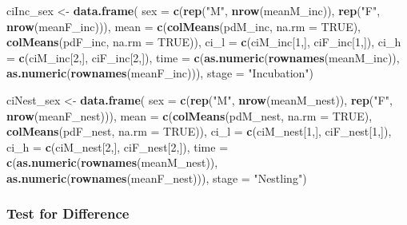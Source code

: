 \documentclass[]{article}
\newenvironment{Shaded}{\begin{snugshade}}{\end{snugshade}}
\newcommand{\DataTypeTok}[1]{\textcolor[rgb]{0.13,0.29,0.53}{#1}}
\newcommand{\DecValTok}[1]{\textcolor[rgb]{0.00,0.00,0.81}{#1}}
\newcommand{\KeywordTok}[1]{\textcolor[rgb]{0.13,0.29,0.53}{\textbf{#1}}}
\newcommand{\NormalTok}[1]{#1}
\newcommand{\OtherTok}[1]{\textcolor[rgb]{0.56,0.35,0.01}{#1}}
\newcommand{\StringTok}[1]{\textcolor[rgb]{0.31,0.60,0.02}{#1}}
\begin{document}
\begin{Shaded}
\begin{Highlighting}[]
\NormalTok{ciInc_sex <-}\StringTok{ }\KeywordTok{data.frame}\NormalTok{(}
    \DataTypeTok{sex =} \KeywordTok{c}\NormalTok{(}\KeywordTok{rep}\NormalTok{(}\StringTok{"M"}\NormalTok{, }\KeywordTok{nrow}\NormalTok{(meanM_inc)), }\KeywordTok{rep}\NormalTok{(}\StringTok{"F"}\NormalTok{, }\KeywordTok{nrow}\NormalTok{(meanF_inc))),}
    \DataTypeTok{mean =} \KeywordTok{c}\NormalTok{(}\KeywordTok{colMeans}\NormalTok{(pdM_inc, }\DataTypeTok{na.rm =} \OtherTok{TRUE}\NormalTok{), }\KeywordTok{colMeans}\NormalTok{(pdF_inc, }\DataTypeTok{na.rm =} \OtherTok{TRUE}\NormalTok{)),}
    \DataTypeTok{ci_l =} \KeywordTok{c}\NormalTok{(ciM_inc[}\DecValTok{1}\NormalTok{,], ciF_inc[}\DecValTok{1}\NormalTok{,]),}
    \DataTypeTok{ci_h =} \KeywordTok{c}\NormalTok{(ciM_inc[}\DecValTok{2}\NormalTok{,], ciF_inc[}\DecValTok{2}\NormalTok{,]),}
    \DataTypeTok{time =} \KeywordTok{c}\NormalTok{(}\KeywordTok{as.numeric}\NormalTok{(}\KeywordTok{rownames}\NormalTok{(meanM_inc)), }\KeywordTok{as.numeric}\NormalTok{(}\KeywordTok{rownames}\NormalTok{(meanF_inc))),}
    \DataTypeTok{stage =} \StringTok{"Incubation"}\NormalTok{)}


\NormalTok{ciNest_sex <-}\StringTok{ }\KeywordTok{data.frame}\NormalTok{(}
    \DataTypeTok{sex =} \KeywordTok{c}\NormalTok{(}\KeywordTok{rep}\NormalTok{(}\StringTok{"M"}\NormalTok{, }\KeywordTok{nrow}\NormalTok{(meanM_nest)), }\KeywordTok{rep}\NormalTok{(}\StringTok{"F"}\NormalTok{, }\KeywordTok{nrow}\NormalTok{(meanF_nest))),}
    \DataTypeTok{mean =} \KeywordTok{c}\NormalTok{(}\KeywordTok{colMeans}\NormalTok{(pdM_nest, }\DataTypeTok{na.rm =} \OtherTok{TRUE}\NormalTok{), }\KeywordTok{colMeans}\NormalTok{(pdF_nest, }\DataTypeTok{na.rm =} \OtherTok{TRUE}\NormalTok{)),}
    \DataTypeTok{ci_l =} \KeywordTok{c}\NormalTok{(ciM_nest[}\DecValTok{1}\NormalTok{,], ciF_nest[}\DecValTok{1}\NormalTok{,]),}
    \DataTypeTok{ci_h =} \KeywordTok{c}\NormalTok{(ciM_nest[}\DecValTok{2}\NormalTok{,], ciF_nest[}\DecValTok{2}\NormalTok{,]),}
    \DataTypeTok{time =} \KeywordTok{c}\NormalTok{(}\KeywordTok{as.numeric}\NormalTok{(}\KeywordTok{rownames}\NormalTok{(meanM_nest)), }\KeywordTok{as.numeric}\NormalTok{(}\KeywordTok{rownames}\NormalTok{(meanF_nest))),}
    \DataTypeTok{stage =} \StringTok{"Nestling"}\NormalTok{)}
\end{Highlighting}
\end{Shaded}

\hypertarget{test-for-difference}{%
\subsubsection{Test for Difference}\label{test-for-difference}}
\end{document}
